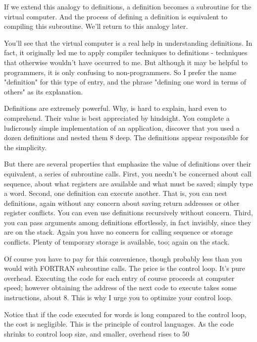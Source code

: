 \documentclass[b5paper, oneside]{book}
\begin{document}
If we extend this analogy to definitions, a definition becomes a subroutine for the virtual computer. And the process of defining a definition is equivalent to compiling this subroutine. We'll return to this analogy later.

You'll see that the virtual computer is a real help in understanding definitions. In fact, it originally led me to apply compiler techniques to definitions - techniques that otherwise wouldn't have occurred to me. But although it may be helpful to programmers, it is only confusing to non-programmers. So I prefer the name "definition" for this type of entry, and the phrase "defining one word in terms of others" as its explanation.

Definitions are extremely powerful. Why, is hard to explain, hard even to comprehend. Their value is best appreciated by hindsight. You complete a ludicrously simple implementation of an application, discover that you used a dozen definitions and nested them 8 deep. The definitions appear responsible for the simplicity.

But there are several properties that emphasize the value of definitions over their equivalent, a series of subroutine calls. First, you needn't be concerned about call sequence, about what registers are available and what must be saved; simply type a word. Second, one definition can execute another. That is, you can nest definitions, again without any concern about saving return addresses or other register conflicts. You can even use definitions recursively without concern. Third, you can pass arguments among definitions effortlessly, in fact invisibly, since they are on the stack. Again you have no concern for calling sequence or storage conflicts. Plenty of temporary storage is available, too; again on the stack.

Of course you have to pay for this convenience, though probably less than you would with FORTRAN subroutine calls. The price is the control loop. It's pure overhead. Executing the code for each entry of course proceeds at computer speed; however obtaining the address of the next code to execute takes some instructions, about 8. This is why I urge you to optimize your control loop.

Notice that if the code executed for words is long compared to the control loop, the cost is negligible. This is the principle of control languages. As the code shrinks to control loop size, and smaller, overhead rises to 50%
\end{document}
